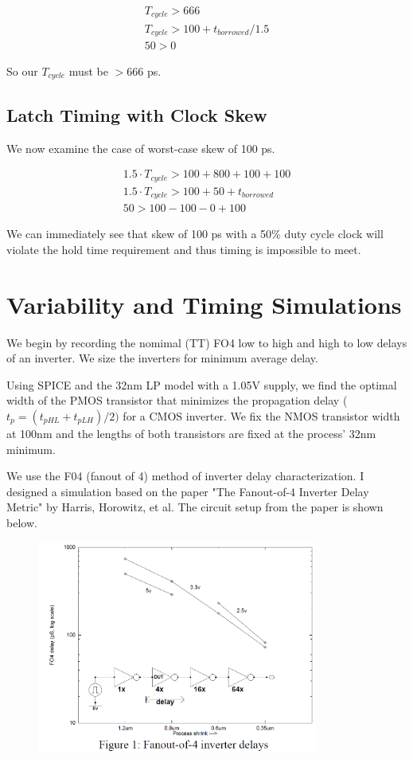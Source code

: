 \documentclass[11pt]{article}
\begin{document}
\begin{eqnarray}
	T_{cycle} > 666 \nonumber \\
	T_{cycle} > 100 + t_{borrowed}/1.5 \nonumber \\
	50 > 0 \nonumber 
\end{eqnarray}

So our $T_{cycle}$ must be $> 666$ ps.

\subsection{Latch Timing with Clock Skew}
We now examine the case of worst-case skew of 100 ps.

\begin{eqnarray}
	1.5 \cdot T_{cycle} > 100 + 800 + 100 + 100 \nonumber \\
	1.5 \cdot T_{cycle} > 100 + 50 + t_{borrowed} \nonumber \\
	50 > 100 - 100 - 0 + 100 \nonumber 
\end{eqnarray}

We can immediately see that skew of 100 ps with a 50\% duty cycle clock will violate the hold time requirement and thus timing is impossible to meet.

\section{Variability and Timing Simulations}

We begin by recording the nomimal (TT) FO4 low to high and high to low delays of an inverter. We size the inverters for minimum average delay.

Using SPICE and the 32nm LP model with a 1.05V supply, we find the optimal width of the PMOS transistor that minimizes the propagation delay ($t_{p} = (t_{pHL} + t_{pLH}) / 2)$ for a CMOS inverter. We fix the NMOS transistor width at 100nm and the lengths of both transistors are fixed at the process' 32nm minimum.

We use the F04 (fanout of 4) method of inverter delay characterization. I designed a simulation based on the paper "The Fanout-of-4 Inverter Delay Metric" by Harris, Horowitz, et al. The circuit setup from the paper is shown below.

\begin{figure}[H]
	\centerline{\includegraphics[height=7cm]{images/f04_figure.png}}
\end{figure}
\end{document}
